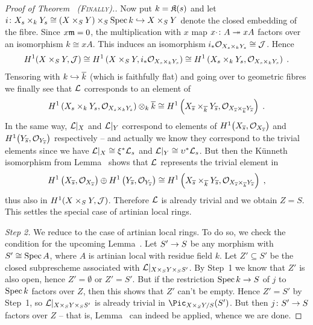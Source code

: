 \documentclass[a4paper,parskip=half,numbers=enddot, DIV=12]{scrreprt}
\begin{document}
\begin{proof}[Proof of Theorem~ \textsc{(Finally)}.]
	Now put $k=\mathfrak{K}(s)$ and let $i\colon X_s\times_kY_s\cong (X\times_SY)\times_S\Spec k\monomorphism X\times_SY$ denote the closed embedding of the fibre. Since $x\mathfrak{m}=0$, the multiplication with $x$ map $x\cdot\colon A\epimorphism xA$ factors over an isomorphism $k\cong xA$. This induces an isomorphism $i_*\mathcal{O}_{X_s\times_kY_s}\cong \mathcal{J}$. Hence
	\begin{align*}
		H^1(X\times_SY,\mathcal{J})\cong H^1\left(X\times_SY,i_*\mathcal{O}_{X_s\times_kY_s}\right)\cong H^1\left(X_s\times_kY_s,\mathcal{O}_{X_s\times_kY_s}\right)\;.
	\end{align*}
	Tensoring with $k\monomorphism \ov{k}$ (which is faithfully flat) and going over to geometric fibres we finally see that $\mathcal{L}$ corresponds to an element of
	\begin{align*}
		H^1\left(X_s\times_kY_s,\mathcal{O}_{X_s\times_kY_s}\right)\otimes_k\overline{k}\cong H^1\left(X_{\overline{s}}\times_{\overline{k}}Y_{\overline{s}},\mathcal{O}_{X_{\overline{s}}\times_{\overline{k}}Y_{\overline{s}}}\right)\;.
	\end{align*}
	In the same way, $\mathcal{L}|_X$ and $\mathcal{L}|_Y$ correspond to elements of $H^1\big(X_{\overline{s}},\mathcal{O}_{X_{\overline{s}}}\big)$ and $H^1\big(Y_{\overline{s}},\mathcal{O}_{Y_{\overline{s}}}\big)$ respectively -- and actually we know they correspond to the trivial elements since we have $\mathcal{L}|_X\cong\xi^*\mathcal{L}_s$ and $\mathcal{L}|_Y\cong \upsilon^*\mathcal{L}_s$. But then the Künneth isomorphism from Lemma~ shows that $\mathcal{L}$ represents the trivial element in
	\begin{align*}
		H^1\left(X_{\overline{s}},\mathcal{O}_{X_{\overline{s}}}\right)\oplus H^1\left(Y_{\overline{s}},\mathcal{O}_{Y_{\overline{s}}}\right)\cong H^1\left(X_{\overline{s}}\times_{\overline{k}}Y_{\overline{s}},\mathcal{O}_{X_{\overline{s}}\times_{\overline{k}}Y_{\overline{s}}}\right)\;,
	\end{align*}
	thus also in $H^1(X\times_SY,\mathcal{J})$. Therefore $\mathcal{L}$ is already trivial and we obtain $Z=S$. This settles the special case of artinian local rings.
	
	\emph{Step 2.} We reduce to the case of artinian local rings. To do so, we check the condition for the upcoming Lemma~. Let $S'\morphism S$ be any morphism with $S'\cong \operatorname{Spec} A$, where $A$ is artinian local with residue field $k$. Let $Z'\subseteq S'$ be the closed subprescheme associated with $\mathcal{L}|_{X\times_SY\times_SS'}$. By Step~1 we know that $Z'$ is also open, hence $Z'=\emptyset$ or $Z'=S'$. But if the restriction $\Spec k\morphism S$ of $j$ to $\operatorname{Spec} k$ factors over $Z$, then this shows that $Z'$ can't be empty. Hence $Z'=S'$ by Step~1, so $\mathcal{L}|_{X\times_SY\times_SS'}$ is already trivial in $\Pic_{X\times_SY/S}(S')$. But then $j\colon S'\morphism S$ factors over $Z$ -- that is, Lemma~ can indeed be applied, whence we are done.
\end{proof}
\end{document}
